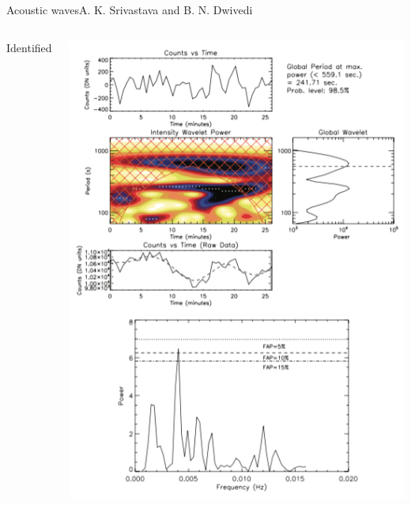 \documentclass[11pt,table]{beamer}
\begin{document}
\begin{frame}[t]{Acoustic waves}{A. K. Srivastava and B. N. Dwivedi}
\begin{columns}
\begin{block}{Identified}
\begin{itemize}
            \end{itemize}
        \end{block}
        \begin{block}{}
            \vspace{-0.5in}
            \includegraphics[height=0.9\paperheight]{ex1.png}
        \end{block}
    \end{columns}
\end{frame}%
\end{document}
